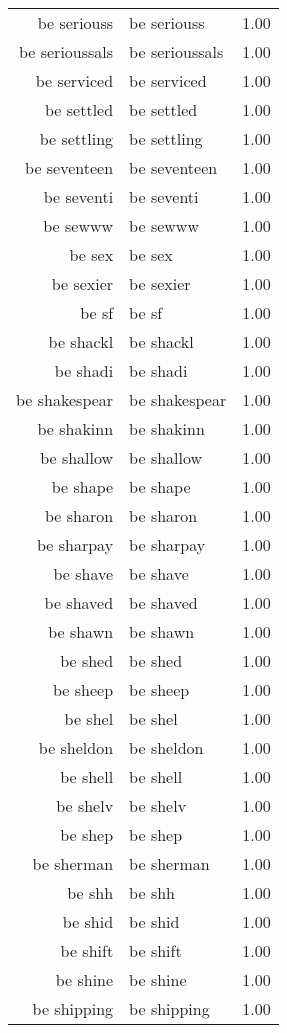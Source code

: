 \begin{table}[ht]
\begin{tabular}{rlr}
  be seriouss & be seriouss & 1.00 \\ 
  be serioussals & be serioussals & 1.00 \\ 
  be serviced & be serviced & 1.00 \\ 
  be settled & be settled & 1.00 \\ 
  be settling & be settling & 1.00 \\ 
  be seventeen & be seventeen & 1.00 \\ 
  be seventi & be seventi & 1.00 \\ 
  be sewww & be sewww & 1.00 \\ 
  be sex & be sex & 1.00 \\ 
  be sexier & be sexier & 1.00 \\ 
  be sf & be sf & 1.00 \\ 
  be shackl & be shackl & 1.00 \\ 
  be shadi & be shadi & 1.00 \\ 
  be shakespear & be shakespear & 1.00 \\ 
  be shakinn & be shakinn & 1.00 \\ 
  be shallow & be shallow & 1.00 \\ 
  be shape & be shape & 1.00 \\ 
  be sharon & be sharon & 1.00 \\ 
  be sharpay & be sharpay & 1.00 \\ 
  be shave & be shave & 1.00 \\ 
  be shaved & be shaved & 1.00 \\ 
  be shawn & be shawn & 1.00 \\ 
  be shed & be shed & 1.00 \\ 
  be sheep & be sheep & 1.00 \\ 
  be shel & be shel & 1.00 \\ 
  be sheldon & be sheldon & 1.00 \\ 
  be shell & be shell & 1.00 \\ 
  be shelv & be shelv & 1.00 \\ 
  be shep & be shep & 1.00 \\ 
  be sherman & be sherman & 1.00 \\ 
  be shh & be shh & 1.00 \\ 
  be shid & be shid & 1.00 \\ 
  be shift & be shift & 1.00 \\ 
  be shine & be shine & 1.00 \\ 
  be shipping & be shipping & 1.00 \\ 

\end{tabular}
\end{table}
